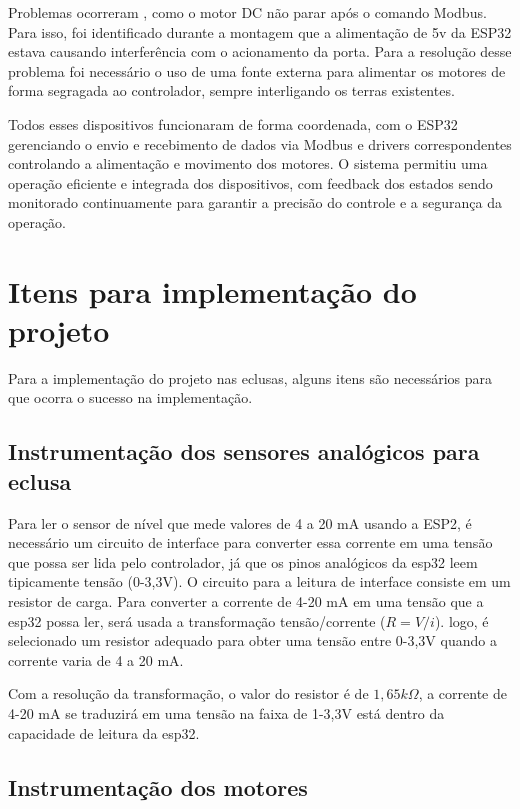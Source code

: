 Problemas ocorreram , como o motor DC não parar após o comando Modbus. Para isso, foi identificado durante a montagem que a alimentação de 5v da ESP32 estava causando interferência com o acionamento da porta. Para a resolução desse problema foi necessário o uso de uma fonte externa para alimentar os motores de forma segragada ao controlador, sempre interligando os terras existentes. 

Todos esses dispositivos funcionaram de forma coordenada, com o ESP32 gerenciando o envio e recebimento de dados via Modbus e drivers correspondentes controlando a alimentação e movimento dos motores. O sistema permitiu uma operação eficiente e integrada dos dispositivos, com feedback dos estados sendo monitorado continuamente para garantir a precisão do controle e a segurança da operação.


\section{Itens para implementação do projeto}

Para a implementação do projeto nas eclusas, alguns itens são necessários para que ocorra o sucesso na implementação.

\subsection{Instrumentação dos sensores analógicos para eclusa}

Para ler o sensor de nível que mede valores de 4 a 20 mA usando a ESP2, é necessário um circuito de interface para converter essa corrente em uma tensão que possa ser lida pelo controlador, já que os pinos analógicos da esp32 leem tipicamente tensão (0-3,3V).
O circuito para a leitura de interface consiste em um resistor de carga. Para converter a corrente de 4-20 mA em uma tensão que a esp32 possa ler, será usada a transformação tensão/corrente ($R=V/i$). logo, é selecionado um resistor adequado para obter uma tensão entre 0-3,3V quando a corrente varia de 4 a 20 mA.

Com a resolução da transformação, o valor do resistor é de $1,65k \Omega$, a corrente de 4-20 mA se traduzirá em uma tensão na faixa de 1-3,3V está dentro da capacidade de leitura da esp32.


\subsection{Instrumentação dos motores}

